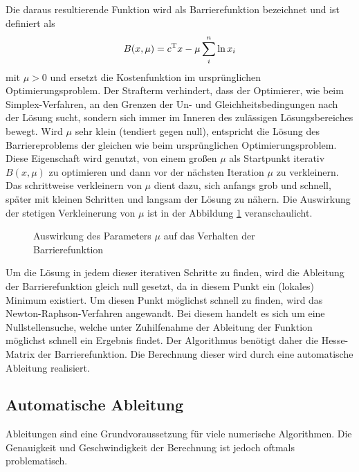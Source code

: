 \documentclass{like}
\begin{document}
Die daraus resultierende Funktion wird als Barrierefunktion bezeichnet und ist definiert als \\
\begin{equation}
	B(x,\mu) =  c\textsuperscript{T}x - \mu \sum_{i}^{n} \ln x_i
\end{equation}
mit $\mu > 0$ und ersetzt die Kostenfunktion im ursprünglichen Optimierungsproblem. Der Strafterm verhindert, dass der Optimierer, wie beim Simplex-Verfahren, an den Grenzen der Un- und Gleichheitsbedingungen nach der Lösung sucht, sondern sich immer im Inneren des zulässigen Lösungsbereiches bewegt. Wird \(\mu\) sehr klein (tendiert gegen null), entspricht die Lösung des Barriereproblems der gleichen wie beim ursprünglichen Optimierungsproblem. Diese Eigenschaft wird genutzt, von einem großen \(\mu\) als Startpunkt iterativ $B(x,\mu)$ zu optimieren und dann vor der nächsten Iteration \(\mu\) zu verkleinern. Das schrittweise verkleinern von $\mu$ dient dazu, sich anfangs grob und schnell, später mit kleinen Schritten und langsam der Lösung zu nähern. Die Auswirkung der stetigen Verkleinerung von \(\mu\) ist in der Abbildung \ref{fig:iterPointLn} veranschaulicht.

\begin{figure}[ht!]
	\centering
	 
	\caption{Auswirkung des Parameters $\mu$ auf das Verhalten der Barrierefunktion}
	\label{fig:iterPointLn}
\end{figure}

Um die Lösung in jedem dieser iterativen Schritte zu finden, wird die Ableitung der Barrierefunktion gleich null gesetzt, da in diesem Punkt ein (lokales) Minimum existiert. Um diesen Punkt möglichst schnell zu finden, wird das Newton-Raphson-Verfahren angewandt. Bei diesem handelt es sich um eine Nullstellensuche, welche unter Zuhilfenahme der Ableitung der Funktion möglichst schnell ein Ergebnis findet. Der Algorithmus benötigt daher die Hesse-Matrix der Barrierefunktion. Die Berechnung dieser wird durch eine automatische Ableitung realisiert.

\subsection{Automatische Ableitung} 

Ableitungen sind eine Grundvoraussetzung für viele numerische Algorithmen. Die Genauigkeit und Geschwindigkeit der Berechnung ist jedoch oftmals problematisch.
\end{document}
